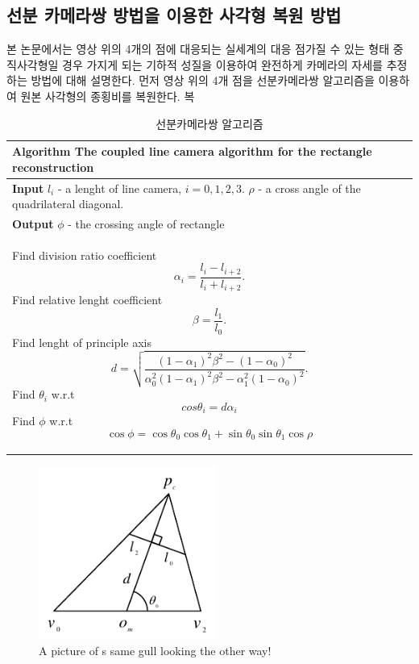 \documentclass[master,korean,final]{cbnu-ecs}
\begin{document}
\subsection{선분 카메라쌍 방법을 이용한 사각형 복원 방법}
본 논문에서는 영상 위의 4개의 점에 대응되는 실세계의 대응 점가질 수 있는 형태 중 직사각형일 경우 가지게 되는 기하적 성질을 이용하여 완전하게 카메라의 자세를 추정하는 방법에 대해 설명한다. 먼저 영상 위의 4개 점을 선분카메라쌍 알고리즘\cite{Lee2012,Lee2013}을 이용하여 원본 사각형의 종횡비를 복원한다. 복
\begin{table}[!t]
\caption{선분카메라쌍 알고리즘}
\begin{tabular}{p{360pt}}
\toprule[1.5pt]
\textbf{Algorithm} The coupled line camera algorithm for the rectangle reconstruction\\
\hline

\textbf{Input}		$l_i$ - a lenght of line camera, $i=0,1,2,3$.
					$\rho$ - a cross angle of the quadrilateral diagonal.\\
\textbf{Output}		$\phi$ - the crossing angle of rectangle
\\

\hline
\begin{algorithmic}[1]
\For{$i=0,1$}
\State Find division ratio coefficient
\[
\alpha_i = \frac{l_i - l_{i+2}}{l_i + l_{i+2}}.
\]
\EndFor
\State Find relative lenght coefficient
\[
\beta = \frac{l_1}{l_0}.
\]
\State Find lenght of principle axis
\[
d = \sqrt{\frac{(1-\alpha_1)^2\beta^2-(1-\alpha_0)^2}{\alpha_0^2(1-\alpha_1)^2\beta^2-\alpha_1^2(1-\alpha_0)^2}}.
\]
\For{$i=0,1$}
\State Find $\theta_i$ w.r.t
\[
cos\theta_i = d\alpha_i
\]
\EndFor
\State Find $\phi$ w.r.t
\[
	\cos{\phi} = \cos{\theta_0}\cos{\theta_1} + \sin{\theta_0}\sin{\theta_1}\cos{\rho}
\]
\end{algorithmic}\\
\toprule[1.5pt]
\end{tabular}
 
\end{table}
\newpage
\begin{figure}[!ht]
  \centering
	\includegraphics[width=220px]{img/linecamera_cropped.pdf}
  \caption{A picture of s same gull looking the other way!}
\label{linecamera}
\end{figure}
\end{document}
